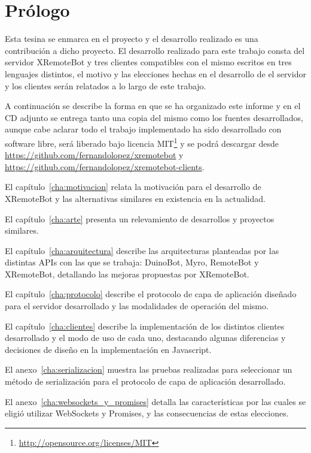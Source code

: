 \chapter*{Prólogo}\label{cha:prologo}


Esta tesina se enmarca en el proyecto \proyecto{} y el desarrollo realizado
es una contribución a dicho proyecto.
El desarrollo realizado para este trabajo consta del servidor XRemoteBot y tres
clientes compatibles
con el mismo escritos en tres lenguajes distintos, el motivo y las elecciones hechas
en el desarrollo de el servidor y los clientes serán relatados a lo largo de este
trabajo.

A continuación se describe la forma en que se ha organizado este informe y en el CD
adjunto se entrega tanto una copia del mismo como los fuentes desarrollados, aunque
cabe aclarar todo el trabajo implementado ha sido desarrollado con software libre,
será liberado bajo licencia
MIT\footnote{\url{http://opensource.org/licenses/MIT}} y se podrá descargar desde
\url{https://github.com/fernandolopez/xremotebot} y
\url{https://github.com/fernandolopez/xremotebot-clients}.

El capítulo~\ref{cha:motivacion} relata la motivación para el desarrollo de XRemoteBot
y las  alternativas similares en existencia en la actualidad.

El capítulo~\ref{cha:arte} presenta un relevamiento de desarrollos y proyectos similares.

El capítulo~\ref{cha:arquitectura} describe las arquitecturas planteadas por las distintas APIs con las que se trabaja: DuinoBot, Myro, RemoteBot y XRemoteBot,  detallando las mejoras propuestas por XRemoteBot.

El capítulo~\ref{cha:protocolo} describe el protocolo de capa de aplicación diseñado para
el servidor desarrollado y las modalidades de operación del mismo.

El capítulo~\ref{cha:clientes} describe la implementación de los distintos clientes desarrollado y el modo de uso
de cada uno, destacando algunas diferencias y decisiones de diseño en la
implementación en Javascript.


El anexo~\ref{cha:serializacion} muestra las pruebas realizadas para seleccionar un método
de serialización para el protocolo de capa de aplicación desarrollado.

El anexo~\ref{cha:websockets_y_promises} detalla las características por las cuales se eligió utilizar
WebSockets y Promises, y las consecuencias de estas elecciones.

